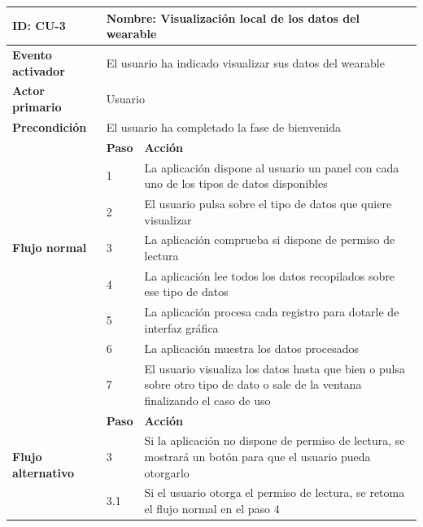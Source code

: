             \begin{table}[h]
                \centering
                \begin{tabularx}{\textwidth}{|l|l|X|}
                    \hline
                    \textbf{ID:} CU-3 & \multicolumn{2}{|X|}{\textbf{Nombre}: Visualización local de los datos del \gls{wearable}} \\
                    \hline
                    \textbf{Evento activador} & \multicolumn{2}{|X|}{El usuario ha indicado visualizar sus datos del \gls{wearable}} \\
                    \hline
                    \textbf{Actor primario} & \multicolumn{2}{|X|}{Usuario} \\
                    \hline
                    \textbf{Precondición} & \multicolumn{2}{|X|}{El usuario ha completado la fase de bienvenida} \\
                    \hline
                    \multirow{7}{*}{\textbf{Flujo normal}} & \textbf{Paso} & \textbf{Acción} \\
                    \cline{2-3} & 1 & La aplicación dispone al usuario un panel con cada uno de los tipos de datos disponibles \\
                    \cline{2-3} & 2 & El usuario pulsa sobre el tipo de datos que quiere visualizar \\
                    \cline{2-3} & 3 & La aplicación comprueba si dispone de permiso de lectura  \\
                    \cline{2-3} & 4 & La aplicación lee todos los datos recopilados sobre ese tipo de datos \\
                    \cline{2-3} & 5 & La aplicación procesa cada registro para dotarle de interfaz gráfica \\
                    \cline{2-3} & 6 & La aplicación muestra los datos procesados \\
                    \cline{2-3} & 7 & El usuario visualiza los datos hasta que bien o pulsa sobre otro tipo de dato o sale de la ventana finalizando el caso de uso \\
                    \hline
                    \multirow{6}{*}{\textbf{Flujo alternativo}} & \textbf{Paso} & \textbf{Acción} \\
                    \cline{2-3} & 3 & Si la aplicación no dispone de permiso de lectura, se mostrará un botón para que el usuario pueda otorgarlo \\
                    \cline{2-3} & 3.1 & Si el usuario otorga el permiso de lectura, se retoma el flujo normal en el paso 4 \\

\end{tabularx}
\end{table}
